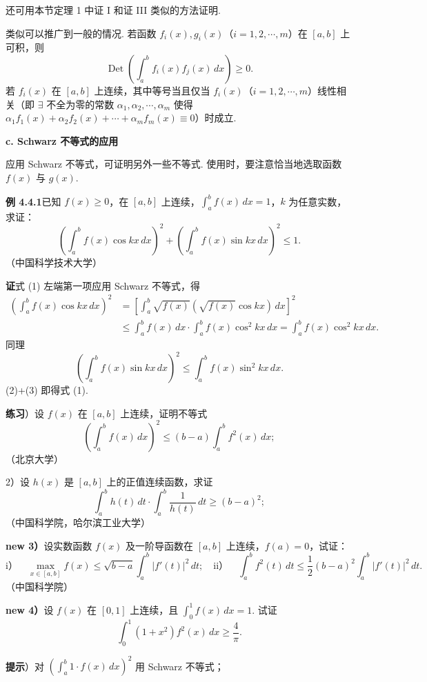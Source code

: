 \documentclass[UTF8,12pt,a4paper,fontset=fandol]{ctexart}
\begin{document}
还可用本节定理 1 中证 I 和证 III 类似的方法证明.

类似可以推广到一般的情况. 若函数 $f_i(x),g_i(x)$（$i=1,2,\cdots,m$）在 $[a,b]$ 上可积，则
\[
\operatorname{Det}\left(\int_a^b f_i(x)f_j(x)\,dx\right)\ge0.
\]
若 $f_i(x)$ 在 $[a,b]$ 上连续，其中等号当且仅当 $f_i(x)$（$i=1,2,\cdots,m$）线性相关（即 $\exists$ 不全为零的常数
$\alpha_1,\alpha_2,\cdots,\alpha_m$ 使得
$\alpha_1f_1(x)+\alpha_2f_2(x)+\cdots+\alpha_mf_m(x)\equiv0$）时成立.

\noindent\textbf{c. Schwarz 不等式的应用}

应用 Schwarz 不等式，可证明另外一些不等式. 使用时，要注意恰当地选取函数 $f(x)$ 与 $g(x)$.

\noindent\textbf{例 4.4.1}\quad 已知 $f(x)\ge0$，在 $[a,b]$ 上连续，$\displaystyle\int_a^b f(x)\,dx=1$，$k$ 为任意实数，求证：
\[
\left(\int_a^b f(x)\cos kx\,dx\right)^2+
\left(\int_a^b f(x)\sin kx\,dx\right)^2\le1. \tag{1}
\]
（中国科学技术大学）

\noindent\textbf{证}\quad 式 (1) 左端第一项应用 Schwarz 不等式，得
\begin{equation}
\begin{aligned}
\left(\int_a^b f(x)\cos kx\,dx\right)^2
&=\left[\int_a^b \sqrt{f(x)}(\sqrt{f(x)}\cos kx)\,dx\right]^2\\
&\le \int_a^b f(x)\,dx\cdot\int_a^b f(x)\cos^2kx\,dx
=\int_a^b f(x)\cos^2kx\,dx.
\end{aligned}
\tag{2}
\end{equation}
同理
\[
\left(\int_a^b f(x)\sin kx\,dx\right)^2
\le\int_a^b f(x)\sin^2kx\,dx. \tag{3}
\]
(2)+(3) 即得式 (1).

\noindent\textbf{练习}）设 $f(x)$ 在 $[a,b]$ 上连续，证明不等式
\[
\left(\int_a^b f(x)\,dx\right)^2\le(b-a)\int_a^b f^2(x)\,dx;
\]
（北京大学）

2）设 $h(x)$ 是 $[a,b]$ 上的正值连续函数，求证
\[
\int_a^b h(t)\,dt\cdot\int_a^b\frac1{h(t)}\,dt\ge(b-a)^2;
\]
（中国科学院，哈尔滨工业大学）

\noindent\textbf{new 3）}\quad 设实数函数 $f(x)$ 及一阶导函数在 $[a,b]$ 上连续，$f(a)=0$，试证：
\[
\text{i）}\quad
\max_{x\in[a,b]}f(x)\le\sqrt{b-a}\int_a^b |f'(t)|^2\,dt;
\quad
\text{ii）}\quad
\int_a^b f^2(t)\,dt\le\frac12(b-a)^2\int_a^b |f'(t)|^2\,dt.
\]
（中国科学院）

\noindent\textbf{new 4）}\quad 设 $f(x)$ 在 $[0,1]$ 上连续，且 $\displaystyle\int_0^1 f(x)\,dx=1$. 试证
\[
\int_0^1(1+x^2)f^2(x)\,dx\ge\frac4\pi.
\]

\noindent\textbf{提示}）对 $\left(\displaystyle\int_a^b 1\cdot f(x)\,dx\right)^2$ 用 Schwarz 不等式；
\end{document}
